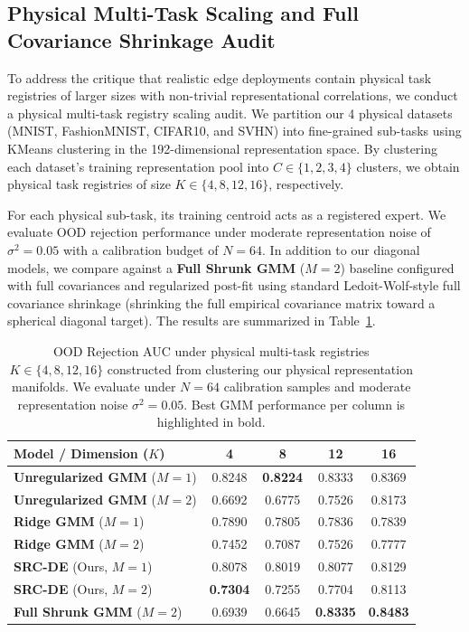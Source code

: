 \subsection{Physical Multi-Task Scaling and Full Covariance Shrinkage Audit}
\label{submission:sec:physical_scaling}

To address the critique that realistic edge deployments contain physical task registries of larger sizes with non-trivial representational correlations, we conduct a physical multi-task registry scaling audit. We partition our 4 physical datasets (MNIST, FashionMNIST, CIFAR10, and SVHN) into fine-grained sub-tasks using KMeans clustering in the 192-dimensional representation space. By clustering each dataset's training representation pool into $C \in \{1, 2, 3, 4\}$ clusters, we obtain physical task registries of size $K \in \{4, 8, 12, 16\}$, respectively. 

For each physical sub-task, its training centroid acts as a registered expert. We evaluate OOD rejection performance under moderate representation noise of $\sigma^2 = 0.05$ with a calibration budget of $N=64$. In addition to our diagonal models, we compare against a {\bf Full Shrunk GMM} ($M=2$) baseline configured with full covariances and regularized post-fit using standard Ledoit-Wolf-style full covariance shrinkage (shrinking the full empirical covariance matrix toward a spherical diagonal target). The results are summarized in Table~\ref{submission:tab:physical_scaling_results}.

\begin{table}[t]
\caption{OOD Rejection AUC under physical multi-task registries $K \in \{4, 8, 12, 16\}$ constructed from clustering our physical representation manifolds. We evaluate under $N=64$ calibration samples and moderate representation noise $\sigma^2=0.05$. Best GMM performance per column is highlighted in bold.}
\label{submission:tab:physical_scaling_results}
\vskip 0.15in
\begin{center}
\begin{small}
\begin{tabular}{lcccc}
\toprule
{\bf Model / Dimension ($K$)} & {\bf 4} & {\bf 8} & {\bf 12} & {\bf 16} \\
\midrule
{\bf Unregularized GMM} ($M=1$)  & 0.8248 & \bf 0.8224 & 0.8333 & 0.8369 \\
{\bf Unregularized GMM} ($M=2$)  & 0.6692 & 0.6775 & 0.7526 & 0.8173 \\
\midrule
{\bf Ridge GMM} ($M=1$)          & 0.7890 & 0.7805 & 0.7836 & 0.7839 \\
{\bf Ridge GMM} ($M=2$)          & 0.7452 & 0.7087 & 0.7526 & 0.7777 \\
\midrule
{\bf SRC-DE} (Ours, $M=1$)       & 0.8078 & 0.8019 & 0.8077 & 0.8129 \\
{\bf SRC-DE} (Ours, $M=2$)       & \bf 0.7304 & 0.7255 & 0.7704 & 0.8113 \\
\midrule
{\bf Full Shrunk GMM} ($M=2$)    & 0.6939 & 0.6645 & \bf 0.8335 & \bf 0.8483 \\
\bottomrule
\end{tabular}
\end{small}
\end{center}
\vskip -0.1in
\end{table}

